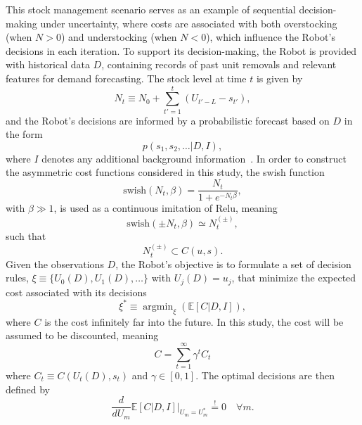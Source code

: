 \documentclass[a4paper,12pt]{article}
\DeclareMathOperator*{\argmin}{argmin}
\theoremstyle{definition}
\begin{document}
	This stock management scenario serves as an example of sequential decision-making under uncertainty, where costs are associated with both overstocking (when $N > 0$) and understocking (when $N < 0$), which influence the Robot's decisions in each iteration. To support its decision-making, the Robot is provided with historical data $D$, containing records of past unit removals and relevant features for demand forecasting. The stock level at time $t$ is given by  
	\begin{equation}
		N_t \equiv N_0 + \sum_{t'=1}^{t} (U_{t'-L} - s_{t'}),
	\end{equation}
	and the Robot's decisions are informed by a probabilistic forecast based on $D$ in the form  
	\begin{equation}
		p(s_1, s_2, \dots | D, I),
		\label{eq:prob_forecast}
	\end{equation}
	where $I$ denotes any additional background information~\citep{Sivia2006}. In order to construct the asymmetric cost functions considered in this study, the swish function
	\begin{equation}
		\text{swish}(N_t,\beta) = \frac{N_t}{1+e^{-N_t\beta}},
	\end{equation}
	with $\beta\gg 1 $, is used as a continuous imitation of Relu, meaning
	\begin{equation}
		\text{swish}(\pm N_t,\beta) \simeq N_t^{(\pm)},
	\end{equation}
	such that
	\begin{equation}
		N_t^{(\pm)}\subset C(u,s).
	\end{equation}
	Given the observations $D$, the Robot's objective is to formulate a set of decision rules, $\xi\equiv \{U_0(D),U_1(D),\dots\}$ with  $U_j(D)=u_j$, that minimize the expected cost associated with its decisions
	\begin{equation}
		\xi^*\equiv \argmin_{\xi}(\mathbb{E}[C|D,I]),
	\end{equation}
	where $C$ is the cost infinitely far into the future. In this study, the cost will be assumed to be discounted, meaning
	\begin{equation}
		C = \sum_{t=1}^{\infty}\gamma^{t}C_t
	\end{equation}
	where $C_t \equiv C(U_t(D),s_t)$ and $\gamma\in [0,1]$. The optimal decisions are then defined by
	\begin{equation}
		\frac{d}{dU_m}\mathbb{E}[C|D,I]\bigg|_{U_m = U_m^*} \overset{!}{=} 0\quad \forall m.
		\label{eq:min_exp_cost}
	\end{equation}
	
\end{document}
